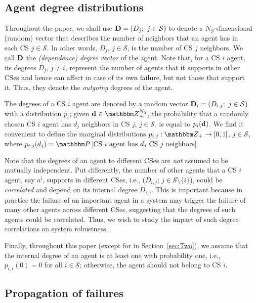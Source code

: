 \documentclass[10pt, journal, compsoc]{IEEEtran}
\newcommand {\cS}{{\mathcal{S}}}
\newcommand {\Z} {{\mathbbm Z}}
\newcommand{\bP}[1]{{\mathbbm P}\left[ #1 \right]}
\begin{document}
\subsection{Agent degree distributions}

Throughout the paper, we shall use ${\bf D} 
= (D_j; \ j \in \cS)$ to denote a 
$N_S$-dimensional (random)
vector that describes the number of neighbors that 
an agent has in each CS $j \in \cS$. In other
words, $D_j$, $j \in \cS$, is the number of 
CS $j$ neighbors. We call ${\bf D}$ the {\em 
(dependence) degree vector} of the agent. Note 
that, for a CS $i$ agent,  
its degrees $D_j$, $j \neq i$, 
represent the number of agents that it
supports in other CSes and hence can affect 
in case of its own 
failure, but not those that support it.
Thus, they denote the {\em outgoing}
degrees of the agent. 


The degrees of a CS $i$ agent are denoted by
a random vector ${\bf D}_i = (D_{i,j}; 
\ j \in \cS)$ with a 
distribution $p_i$; given 
${\bf d} \in \Z_+^{N_S}$, the probability 
that a randomly chosen CS $i$ agent
has $d_j$ neighbors in CS $j$, $j \in \cS$, 
is equal to $p_i({\bf d})$. We find it 
convenient to define the marginal distributions
$p_{i,j}: \Z_+ \to [0, 1]$, $j \in \cS$, where
$p_{i,j}(d_j) 
= \bP{\mbox{CS $i$ agent has $d_j$ CS 
	$j$ neighbors}}$.   

Note that the degrees of an agent 
to different CSes are {\em not} assumed to be
mutually independent. Put differently, 
the number of other agents that a CS $i$
agent, say $a^i$, supports in 
different CSes, i.e., ($D_{i,j}$; $j \in 
\cS \setminus \{i\}$), 
could be {\em correlated} and depend on its
internal degree $D_{i,i}$. This 
is important because in practice the failure of an 
important agent in a system may trigger the 
failure of many
other agents across different CSes, suggesting
that the degrees of such agents could be 
correlated. Thus, we wish to study the impact
of such degree correlations on system robustness. 

Finally, throughout this paper (except for in 
Section~\ref{sec:Two}), we assume that the
internal degree of an agent is at least one with
probability one, i.e., $p_{i,i}(0) = 0$ for
all $i \in \cS$; otherwise, the agent should
not belong to CS $i$. 




\subsection{Propagation of failures}
\end{document}

